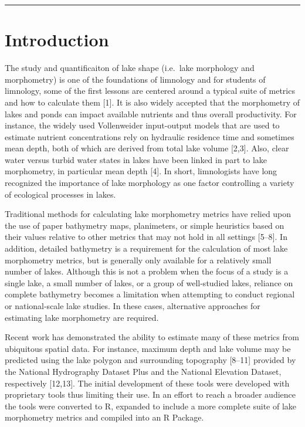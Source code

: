 \documentclass[11pt,]{article}
\begin{document}
\vspace{3mm}

\hrule

\doublespace

\section{Introduction}\label{introduction}

The study and quantificaiton of lake shape (i.e.~lake morphology and
morphometry) is one of the foundations of limnology and for students of
limnology, some of the first lessons are centered around a typical suite
of metrics and how to calculate them {[}1{]}. It is also widely accepted
that the morphometry of lakes and ponds can impact available nutrients
and thus overall productivity. For instance, the widely used
Vollenweider input-output models that are used to estimate nutrient
concentrations rely on hydraulic residence time and sometimes mean
depth, both of which are derived from total lake volume {[}2,3{]}. Also,
clear water versus turbid water states in lakes have been linked in part
to lake morphometry, in particular mean depth {[}4{]}. In short,
limnologists have long recognized the importance of lake morphology as
one factor controlling a variety of ecological processes in lakes.

Traditional methods for calculating lake morphometry metrics have relied
upon the use of paper bathymetry maps, planimeters, or simple heuristics
based on their values relative to other metrics that may not hold in all
settings {[}5--8{]}. In addition, detailed bathymetry is a requirement
for the calculation of most lake morphometry metrics, but is generally
only available for a relatively small number of lakes. Although this is
not a problem when the focus of a study is a single lake, a small number
of lakes, or a group of well-studied lakes, reliance on complete
bathymetry becomes a limitation when attempting to conduct regional or
national-scale lake studies. In these cases, alternative approaches for
estimating lake morphometry are required.

Recent work has demonstrated the ability to estimate many of these
metrics from ubiquitous spatial data. For instance, maximum depth and
lake volume may be predicted using the lake polygon and surrounding
topography {[}8--11{]} provided by the National Hydrography Dataset Plus
and the National Elevation Dataset, respectively {[}12,13{]}. The
initial development of these tools were developed with proprietary tools
thus limiting their use. In an effort to reach a broader audience the
tools were converted to R, expanded to include a more complete suite of
lake morphometry metrics and compiled into an R Package.
\end{document}
